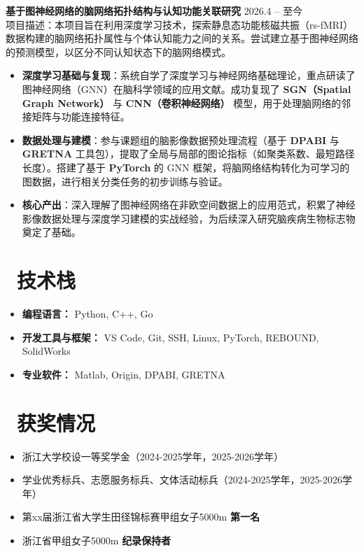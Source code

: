 \documentclass[11pt]{article}
\newlength{\intraProjectTitleSep}
\newcommand{\titlebreak}{\\[\intraProjectTitleSep]}
\newlength{\intraProjectListTopSep}
\begin{document}
\textbf{基于图神经网络的脑网络拓扑结构与认知功能关联研究} \hfill 2026.4 -- 至今 \titlebreak
项目描述：本项目旨在利用深度学习技术，探索静息态功能核磁共振（rs-fMRI）数据构建的脑网络拓扑属性与个体认知能力之间的关系。尝试建立基于图神经网络的预测模型，以区分不同认知状态下的脑网络模式。
\begin{itemize}[nosep, topsep=\intraProjectListTopSep]
    \item \textbf{深度学习基础与复现}：系统自学了深度学习与神经网络基础理论，重点研读了图神经网络（GNN）在脑科学领域的应用文献。成功复现了 \textbf{SGN（Spatial Graph Network）} 与 \textbf{CNN（卷积神经网络）} 模型，用于处理脑网络的邻接矩阵与功能连接特征。
    \item \textbf{数据处理与建模}：参与课题组的脑影像数据预处理流程（基于 \textbf{DPABI} 与 \textbf{GRETNA} 工具包），提取了全局与局部的图论指标（如聚类系数、最短路径长度）。搭建了基于 \textbf{PyTorch} 的 GNN 框架，将脑网络结构转化为可学习的图数据，进行相关分类任务的初步训练与验证。
    \item \textbf{核心产出}：深入理解了图神经网络在非欧空间数据上的应用范式，积累了神经影像数据处理与深度学习建模的实战经验，为后续深入研究脑疾病生物标志物奠定了基础。
\end{itemize}

\section{\makebox[\widthof{\faCogs}][c]{\color{CVBlue}\faCogs}\ 技术栈}
\begin{itemize}[nosep]
    \item \textbf{编程语言：} Python, C++, Go
    \item \textbf{开发工具与框架：} VS Code, Git, SSH, Linux, PyTorch, REBOUND, SolidWorks
    \item \textbf{专业软件：} Matlab, Origin, DPABI, GRETNA
\end{itemize}

\section{\makebox[\widthof{\faGraduationCap}][c]{\color{CVBlue}\faList}\ 获奖情况}
\begin{itemize}
    \item 浙江大学校设一等奖学金（2024-2025学年，2025-2026学年）
    \item 学业优秀标兵、志愿服务标兵、文体活动标兵（2024-2025学年，2025-2026学年）
    \item 第xx届浙江省大学生田径锦标赛甲组女子5000m \textbf{第一名}
    \item 浙江省甲组女子5000m \textbf{纪录保持者}
\end{itemize}
    
\end{document}
